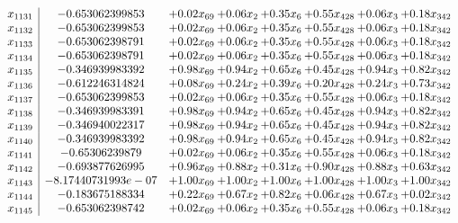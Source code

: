 \documentclass[8pt]{article}
\begin{document}
\[\begin{array}{c| c c@{\hskip 2pt} c@{\hskip 2pt} c@{\hskip 2pt} c@{\hskip 2pt} c@{\hskip 2pt} c@{\hskip 2pt} }
 x_{1131}   &  -0.653062399853 & +  0.02 x_{69} & +  0.06 x_{2} & +  0.35 x_{6} & +  0.55 x_{428} & +  0.06 x_{3} & +  0.18 x_{342}\\
 x_{1132}   &  -0.653062399853 & +  0.02 x_{69} & +  0.06 x_{2} & +  0.35 x_{6} & +  0.55 x_{428} & +  0.06 x_{3} & +  0.18 x_{342}\\
 x_{1133}   &  -0.653062398791 & +  0.02 x_{69} & +  0.06 x_{2} & +  0.35 x_{6} & +  0.55 x_{428} & +  0.06 x_{3} & +  0.18 x_{342}\\
 x_{1134}   &  -0.653062398791 & +  0.02 x_{69} & +  0.06 x_{2} & +  0.35 x_{6} & +  0.55 x_{428} & +  0.06 x_{3} & +  0.18 x_{342}\\
 x_{1135}   &  -0.346939983392 & +  0.98 x_{69} & +  0.94 x_{2} & +  0.65 x_{6} & +  0.45 x_{428} & +  0.94 x_{3} & +  0.82 x_{342}\\
 x_{1136}   &  -0.612246314824 & +  0.08 x_{69} & +  0.24 x_{2} & +  0.39 x_{6} & +  0.20 x_{428} & +  0.24 x_{3} & +  0.73 x_{342}\\
 x_{1137}   &  -0.653062399853 & +  0.02 x_{69} & +  0.06 x_{2} & +  0.35 x_{6} & +  0.55 x_{428} & +  0.06 x_{3} & +  0.18 x_{342}\\
 x_{1138}   &  -0.346939983391 & +  0.98 x_{69} & +  0.94 x_{2} & +  0.65 x_{6} & +  0.45 x_{428} & +  0.94 x_{3} & +  0.82 x_{342}\\
 x_{1139}   &  -0.346940022317 & +  0.98 x_{69} & +  0.94 x_{2} & +  0.65 x_{6} & +  0.45 x_{428} & +  0.94 x_{3} & +  0.82 x_{342}\\
 x_{1140}   &  -0.346939983392 & +  0.98 x_{69} & +  0.94 x_{2} & +  0.65 x_{6} & +  0.45 x_{428} & +  0.94 x_{3} & +  0.82 x_{342}\\
 x_{1141}   &  -0.65306239879 & +  0.02 x_{69} & +  0.06 x_{2} & +  0.35 x_{6} & +  0.55 x_{428} & +  0.06 x_{3} & +  0.18 x_{342}\\
 x_{1142}   &  -0.693877626995 & +  0.96 x_{69} & +  0.88 x_{2} & +  0.31 x_{6} & +  0.90 x_{428} & +  0.88 x_{3} & +  0.63 x_{342}\\
 x_{1143}   &  -8.17440731993e-07 & +  1.00 x_{69} & +  1.00 x_{2} & +  1.00 x_{6} & +  1.00 x_{428} & +  1.00 x_{3} & +  1.00 x_{342}\\
 x_{1144}   &  -0.183675188334 & +  0.22 x_{69} & +  0.67 x_{2} & +  0.82 x_{6} & +  0.06 x_{428} & +  0.67 x_{3} & +  0.02 x_{342}\\
 x_{1145}   &  -0.653062398742 & +  0.02 x_{69} & +  0.06 x_{2} & +  0.35 x_{6} & +  0.55 x_{428} & +  0.06 x_{3} & +  0.18 x_{342}\\

\end{array}\]
\end{document}
